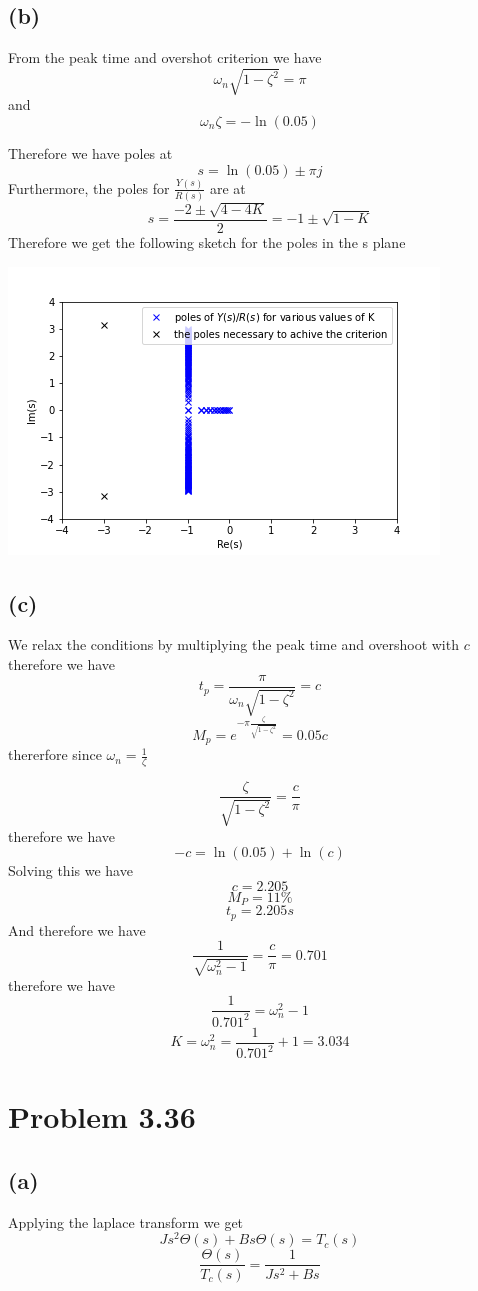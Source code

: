 \documentclass[12pt]{article}
\begin{document}
\subsection*{(b)}
From the peak time and overshot criterion we have
$$\omega_n\sqrt{1-\zeta^2}=\pi$$
and
$$\omega_n\zeta=-\ln(0.05)$$

Therefore we have poles at 
$$s=\ln(0.05)\pm \pi j$$
Furthermore, the poles for $\frac{Y(s)}{R(s)}$ are at 
$$s=\frac{-2\pm\sqrt{4-4K}}{2}=-1\pm\sqrt{1-K}$$
Therefore we get the following sketch for the poles in the s plane 

\includegraphics[scale=.5]{Problem3}
\FloatBarrier
\subsection*{(c)}
We relax the conditions by multiplying the peak time
and overshoot with $c$ therefore we have
$$t_p=\frac{\pi}{\omega_n\sqrt{1-\zeta^2}}=c$$
$$M_p=e^{-\pi\frac{\zeta}{\sqrt{1-\zeta^2}}}=0.05c$$
thererfore since $\omega_n=\frac{1}{\zeta}$

$$\frac{\zeta}{\sqrt{1-\zeta^2}}=\frac{c}{\pi}$$
therefore we have
$$-c=\ln(0.05)+\ln(c)$$
Solving this we have
$$c=2.205$$
$$M_P=11\%$$
$$t_p=2.205s$$
And therefore we have
$$\frac{1}{\sqrt{\omega_n^2-1}}=\frac{c}{\pi}=0.701$$
therefore we have
$$\frac{1}{0.701^2}=\omega_n^2-1$$
$$K=\omega_n^2=\frac{1}{0.701^2}+1=3.034$$


\section*{Problem 3.36}
\subsection*{(a)}
Applying the laplace transform we get
$$Js^2\Theta(s)+Bs\Theta(s)=T_c(s)$$
$$\frac{\Theta(s)}{T_c(s)}=\boxed{\frac{1}{Js^2+Bs}}$$
\end{document}

